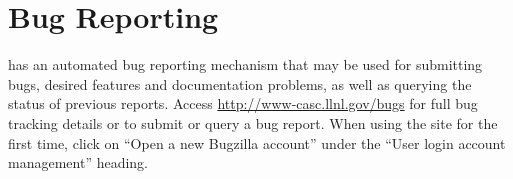 
\section{Bug Reporting}

\hypre{} has an automated bug reporting mechanism that may be used for
submitting bugs, desired features and documentation problems, as well as
querying the status of previous reports.  Access
\url{http://www-casc.llnl.gov/bugs} for full bug tracking details or to submit
or query a bug report.  When using the site for the first time, click on ``Open
a new Bugzilla account'' under the ``User login account management'' heading.
